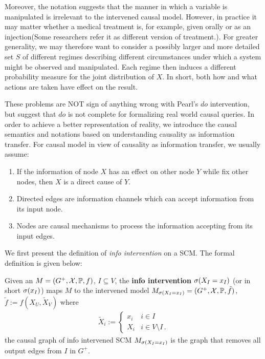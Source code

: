 Moreover, the notation suggests that the manner in which  a variable is manipulated is irrelevant to the intervened causal model. However, in practice it may matter whether a medical treatment is, for example, given orally or as an injection(Some researchers refer it as different version of treatment\cite{Hernan2019}.). For greater generality, we may therefore want to consider a possibly larger and more detailed set $S$ of different regimes describing different circumstances under which a system might be observed and manipulated. Each regime then induces a different probability measure for the joint distribution of $X$. In short, both how and what actions are taken have effect on the result\cite{Marloes2018}. 



These problems are NOT sign of anything wrong with Pearl's $do$ intervention, but suggest that $do$ is not complete for formalizing real world causal queries. In order to achieve a better representation of reality, we introduce the causal semantics and notations based on understanding causality as information transfer. For causal model in view of causality as information transfer, we usually assume:	
\begin{enumerate}[1)]
	\item If the information of node $X$ has an effect on other node $Y$ while fix other nodes, then $X$ is a direct cause of $Y$. 
	\item Directed edges are information channels which can accept information from its input node. 
	\item Nodes are causal mechanisms to process the information accepting from its input edges. 
\end{enumerate}	


We first present the definition of \emph{info intervention} on a SCM. The formal definition is given below:

\begin{Def}
	\label{def:i-intervention}
	Given an \SCM $M=(G^+,\mathcal{X},\mathbb{P}, f)$, $I \subseteq V$, the \textbf{info intervention} $\mathrm{\sigma}(X_I=x_I)$ (or in short $\mathrm{\sigma}(x_I)$) maps $M$ to the intervened model $M_{\sigma(X_I = x_I)} = (G^+,\mathcal{X},\mathbb{P}, \tilde{f})$, $\tilde{f} := f(X_U, \tilde{X}_V)$ where
	$$
	\begin{aligned}
	\tilde{X}_i := \begin{cases}
	x_i & i \in I \\
	X_i & i \in V \setminus I \,.
	\end{cases}
	\end{aligned}
	$$
	the causal graph of info intervened SCM $M_{\mathrm{\sigma}(X_I=x_I)}$  is the graph that removes all output edges from $I$ in $G^+$.
\end{Def}



